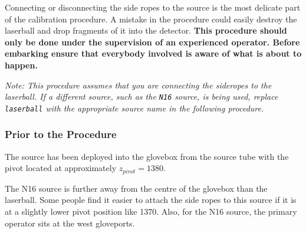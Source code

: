 \documentclass[11pt]{article}
\begin{document}
Connecting or disconnecting the side ropes to the source is the most delicate part of the calibration procedure. A mistake in the procedure could easily destroy the laserball and drop fragments of it into the detector. {\bf This procedure should only be done under the supervision of an experienced operator. Before embarking ensure that everybody involved is aware of what is about to happen.}

{\it Note: This procedure assumes that you are connecting the sideropes to the laserball. If a different source, such as the \verb+N16+ source, is being used, replace \verb+laserball+ with the appropriate source name in the following procedure.}

\subsubsection{Prior to the Procedure}
The source has been deployed into the glovebox from the source tube with the pivot located at approximately $z_{pivot} = 1380$.

The N16 source is further away from the centre of the glovebox than the laserball. Some people find it easier to attach the side ropes to this source if it is at a slightly lower pivot position like 1370. Also, for the N16 source, the primary operator sits at the west gloveports.
\end{document}
